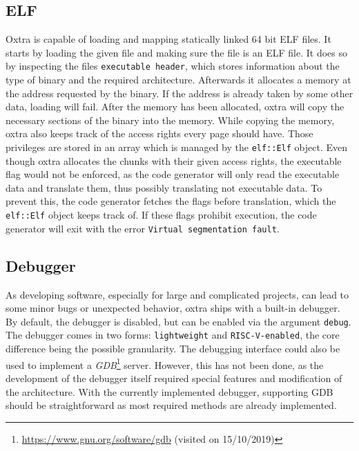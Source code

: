 \subsection{ELF}
	\label{documentation_elf}
	Oxtra is capable of loading and mapping statically linked 64 bit ELF files. It starts by loading the given file and making sure the file is an ELF file. It does so by inspecting the files \texttt{executable header}, which stores information about the type of binary and the required architecture. Afterwards it allocates a memory at the address requested by the binary. If the address is already taken by some other data, loading will fail. After the memory has been allocated, oxtra will copy the necessary sections of the binary into the memory. While copying the memory, oxtra also keeps track of the access rights every page should have. Those privileges are stored in an array which is managed by the \texttt{elf::Elf} object. Even though oxtra allocates the chunks with their given access rights, the executable flag would not be enforced, as the code generator will only read the executable data and translate them, thus possibly translating not executable data. To prevent this, the code generator fetches the flags before translation, which the \texttt{elf::Elf} object keeps track of. If these flags prohibit execution, the code generator will exit with the error \texttt{Virtual segmentation fault}. %

\subsection{Debugger}
\label{Debugger}
	As developing software, especially for large and complicated projects, can lead to some minor bugs or unexpected behavior, oxtra ships with a built-in debugger. By default, the debugger is disabled, but can be enabled via the argument \texttt{debug}. The debugger comes in two forms: \texttt{lightweight} and \texttt{RISC-V-enabled}, the core difference being the possible granularity. The debugging interface could also be used to implement a \emph{GDB}\footnote{\url{https://www.gnu.org/software/gdb} (visited on 15/10/2019)} server. However, this has not been done, as the development of the debugger itself required special features and modification of the architecture. With the currently implemented debugger, supporting GDB should be straightforward as most required methods are already implemented. 
	
